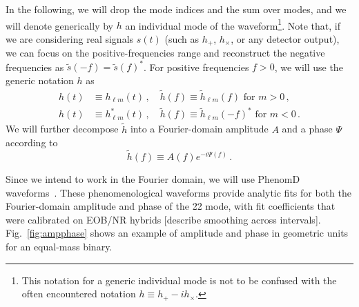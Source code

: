 \documentclass[aps,showpacs,%
prd,superscriptaddress,nofootinbib]{revtex4}
\newcommand{\be}{\begin{equation}}
\newcommand{\ee}{\end{equation}}
\newcommand{\nn}{\nonumber}
\begin{document}
In the following, we will drop the mode indices and the sum over modes, and we will denote generically by $h$ an individual mode of the waveform\footnote{This notation for a generic individual mode is not to be confused with the often encountered notation $h\equiv h_{+} - i h_{\times}$.}. Note that, if we are considering real signals $s(t)$ (such as $h_{+}$, $h_{\times}$, or any detector output), we can focus  on the positive-frequencies range and reconstruct the negative frequencies as $\tilde{s}(-f) = \tilde{s}(f)^{*}$. For positive frequencies $f>0$, we will use the generic notation $h$ as
\begin{align}\label{eq:notationhsignm}
	h(t) &\equiv h_{\ell m}(t) \,, \quad \tilde{h}(f) \equiv \tilde{h}_{\ell m}(f) \text{ for } m>0 \,, \nn\\
	h(t) &\equiv h_{\ell m}^{*}(t) \,, \quad \tilde{h}(f) \equiv \tilde{h}_{\ell m}(-f)^{*} \text{ for } m<0 \,.
\end{align}
We will further decompose $\tilde{h}$ into a Fourier-domain amplitude $A$ and a phase $\Psi$ according to
\be\label{eq:defAPsi}
	\tilde{h}(f) \equiv A(f) e^{-i\Psi(f)} \,.
\ee

Since we intend to work in the Fourier domain, we will use PhenomD waveforms~\cite{Khan+15}. These phenomenological waveforms provide analytic fits for both the Fourier-domain amplitude and phase of the 22 mode, with fit coefficients that were calibrated on EOB/NR hybrids [describe smoothing across intervals]. Fig.~\ref{fig:ampphase} shows an example of amplitude and phase in geometric units for an equal-mass binary.
\end{document}
